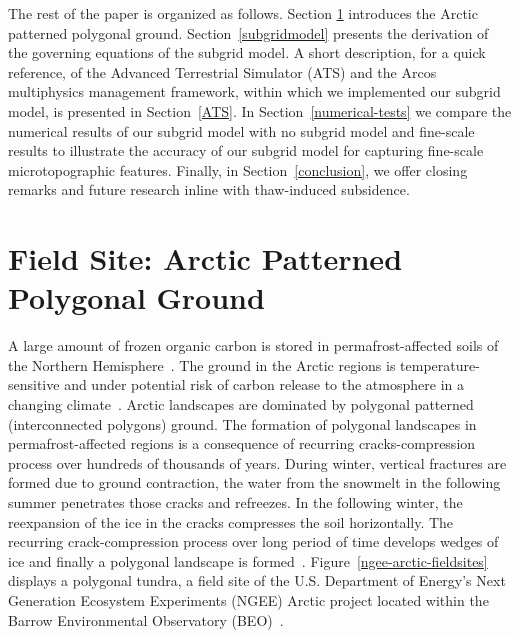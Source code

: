 \documentclass[review,11pt]{elsarticle}
\begin{document}
The rest of the paper is organized as follows. Section \ref{field-site} introduces the Arctic patterned polygonal ground. Section~\ref{subgridmodel} presents the derivation of the governing equations of the subgrid model. A short description, for a quick reference, of the Advanced Terrestrial Simulator (ATS) and the Arcos multiphysics management framework, within which we implemented our subgrid model, is presented in Section~\ref{ATS}. In Section~\ref{numerical-tests} we compare the numerical results of our subgrid model with no subgrid model and fine-scale results to illustrate the accuracy of our subgrid model for capturing fine-scale microtopographic features. Finally, in Section~\ref{conclusion}, we offer closing remarks and future research inline with thaw-induced subsidence.


\section{Field Site: Arctic Patterned Polygonal Ground}\label{field-site}
A large amount of frozen organic carbon is stored in permafrost-affected soils of the Northern Hemisphere~\cite{schuur2015climate,bg-11-6573-2014}. The ground in the Arctic regions is temperature-sensitive and under potential risk of carbon release to the atmosphere in a changing climate~\cite{hinzman2005evidence}.
Arctic landscapes are dominated by polygonal patterned (interconnected polygons) ground. The formation of polygonal landscapes in permafrost-affected regions is a consequence of recurring cracks-compression process over hundreds of thousands of years. During winter, vertical fractures are formed due to ground contraction, the water from the snowmelt in the following summer penetrates those cracks and refreezes. In the following winter, the reexpansion of the ice in the cracks compresses the soil horizontally. The recurring crack-compression process over long period of time develops wedges of ice and finally a polygonal landscape is formed~\cite{lachenbruch1962mechanics,greene1963contraction,mackay1990some,mackay2004thermally}. Figure~\ref{ngee-arctic-fieldsites} displays a polygonal tundra, a field site of the U.S. Department of Energy's Next Generation Ecosystem Experiments (NGEE) Arctic project located within the Barrow Environmental Observatory (BEO)~\cite{kumar2016modeling}.
\end{document}
